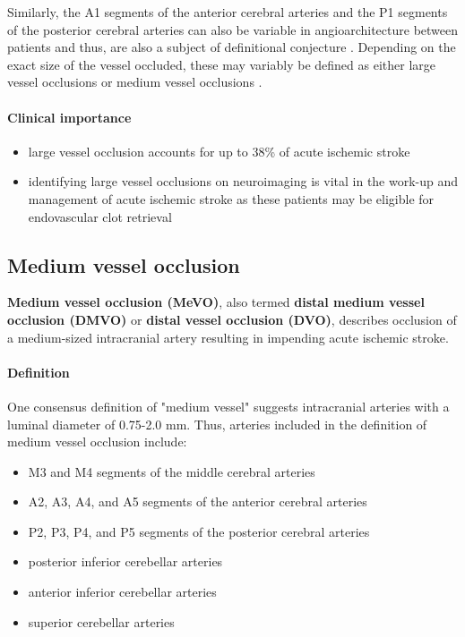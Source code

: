 Similarly, the A1 segments of the anterior cerebral arteries and the P1 segments of the posterior cerebral arteries can also be variable in angioarchitecture between patients and thus, are also a subject of definitional conjecture . Depending on the exact size of the vessel occluded, these may variably be defined as either large vessel occlusions or medium vessel occlusions .
\paragraph{Clinical importance}

\begin{itemize}
	\item
	large vessel occlusion accounts for up to 38\% of acute ischemic stroke 
	\item
	identifying large vessel occlusions on neuroimaging is vital in the work-up and management of acute ischemic stroke as these patients may be eligible for endovascular clot retrieval 
\end{itemize}

\subsection{Medium vessel occlusion}

\textbf{Medium vessel occlusion (MeVO)}, also termed \textbf{distal medium vessel occlusion (DMVO)} or \textbf{distal vessel occlusion (DVO)}, describes occlusion of a medium-sized intracranial artery resulting in impending acute ischemic stroke.

\paragraph{Definition}

One consensus definition of "medium vessel" suggests intracranial arteries with a luminal diameter of 0.75-2.0 mm. Thus, arteries included in the definition of medium vessel occlusion include:

\begin{itemize}
	\item
	M3 and M4 segments of the middle cerebral arteries
	\item
	A2, A3, A4, and A5 segments of the anterior cerebral arteries
	\item
	P2, P3, P4, and P5 segments of the posterior cerebral arteries
	\item
	posterior inferior cerebellar arteries
	\item
	anterior inferior cerebellar arteries
	\item
	superior cerebellar arteries
\end{itemize}

